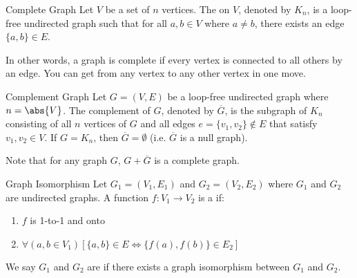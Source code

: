 \documentclass[12pt]{report}
\begin{document}
\begin{dfnbox}{Complete Graph}
	Let $V$ be a set of $n$ vertices. The  on $V$, denoted by $K_n$, is a loop-free undirected graph such that for all $a,b \in V$ where $a \neq b$, there exists an edge $\{a,b\} \in E$.
\end{dfnbox}

In other words, a graph is complete if every vertex is connected to all others by an edge. You can get from any vertex to any other vertex in one move.

\begin{dfnbox}{Complement Graph}
	Let $G = (V,E)$ be a loop-free undirected graph where $n = \abs{V}$. The complement of $G$, denoted by $\overline{G}$, is the subgraph of $K_n$ consisting of all $n$ vertices of $G$ and all edges $e = \{v_1, v_2\} \not \in E$ that satisfy $v_1, v_2 \in V$. If $G = K_n$, then $\overline{G} = \emptyset$ (i.e. $\overline{G}$ is a null graph). 
\end{dfnbox}

Note that for any graph $G$, $G + \overline{G}$ is a complete graph.

\begin{dfnbox}{Graph Isomorphism}
	Let $G_1 = (V_1, E_1)$ and $G_2 = (V_2, E_2)$ where $G_1$ and $G_2$ are undirected graphs. A function $f : V_1 \to V_2$ is a  if:
	\begin{enumerate}
		\item $f$ is 1-to-1 and onto
		\item $\forall (a,b \in V_1) \left[ \{a,b\} \in E \iff \{f(a), f(b)\} \in E_2 \right]$
	\end{enumerate}
\end{dfnbox}

We say $G_1$ and $G_2$ are  if there exists a graph isomorphism between $G_1$ and $G_2$.
\end{document}
